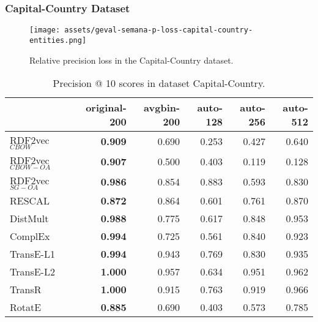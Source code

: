\documentclass[11pt,titlepage,oneside,openany]{book}
\begin{document}
\newpage

\subsubsection{Capital-Country Dataset}
\label{subsubsec:geval-results-semana-capital-country-entities}

\begin{figure}[H]
    \centering
    \texttt{[image: assets/geval-semana-p-loss-capital-country-entities.png]}
    \vspace*{-3mm}
    \caption{Relative precision loss in the Capital-Country dataset.}
    \label{fig:geval-semana-p-loss-capital-country-entities}
\end{figure}


\begin{table}[H]
\centering
\begin{tabular}{lrrrrr}
\toprule
{} &  original-200 &  avgbin-200 &  auto-128 &  auto-256 &  auto-512 \\
\midrule
RDF2vec$_{CBOW}$     &	\textbf{0.909} &       0.690  &     0.253  &     0.427  &     0.640  \\
RDF2vec$_{CBOW-OA}$  &	\textbf{0.907} &       0.500  &     0.403  &     0.119  &     0.128  \\
RDF2vec$_{SG-OA}$    &	\textbf{0.986} &       0.854  &     0.883  &     0.593  &     0.830  \\
RESCAL               &	\textbf{0.872} &       0.864  &     0.601  &     0.761  &     0.870  \\
DistMult             &	\textbf{0.988} &       0.775  &     0.617  &     0.848  &     0.953  \\
ComplEx              &	\textbf{0.994} &       0.725  &     0.561  &     0.840  &     0.923  \\
TransE-L1            &	\textbf{0.994} &       0.943  &     0.769  &     0.830  &     0.935  \\
TransE-L2            &	\textbf{1.000} &       0.957  &     0.634  &     0.951  &     0.962  \\
TransR               &	\textbf{1.000} &       0.915  &     0.763  &     0.919  &     0.966  \\
RotatE               &	\textbf{0.885} &       0.690  &     0.403  &     0.573  &     0.785  \\
\bottomrule
\end{tabular}
\caption{Precision @ 10 scores in dataset Capital-Country.}
\label{tab:geval-semana-p-at-10-capital-country-entities}
\end{table}
\end{document}
